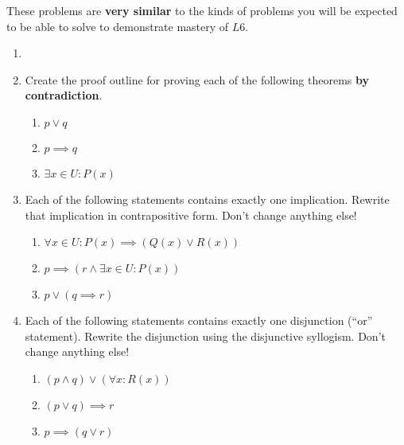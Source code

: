  These problems are \textbf{very similar} to the kinds of problems you will be expected to be able to solve to demonstrate mastery of $L6$.
 
 \begin{xca}
 		\begin{enumerate}
 			\item[]
 				\item Create the proof outline for proving each of the following theorems \textbf{by contradiction}.
 				\begin{enumerate}
 						\item $p \vee q$
 						\item $p \implies q$
 						\item $\exists x \in U: P(x)$
 					\end{enumerate}
 				\item Each of the following statements contains exactly one implication.  Rewrite that implication in contrapositive form.  Don't change anything else!
 				
 				\begin{enumerate}
 						\item $\forall x\in U: P(x) \implies (Q(x) \vee R(x)) $
 						\item $ p \implies (r \wedge \exists x \in U: P(x))$
 						\item $p \vee (q \implies r)$
 					\end{enumerate}
 				
 				\item Each of the following statements contains exactly one disjunction (``or'' statement).  Rewrite the disjunction using the disjunctive syllogism.   Don't change anything else!
 				
 				\begin{enumerate}
 						\item $(p \wedge q) \vee (\forall x: R(x))$
 						\item $(p \vee q) \implies r$
 						\item $p \implies (q \vee r)$
 					\end{enumerate}
 			\end{enumerate}
 	\end{xca}
 
